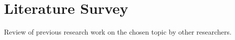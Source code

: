 \chapter{Literature Survey}
\noindent 
Review of previous research work on the chosen topic by other researchers.

